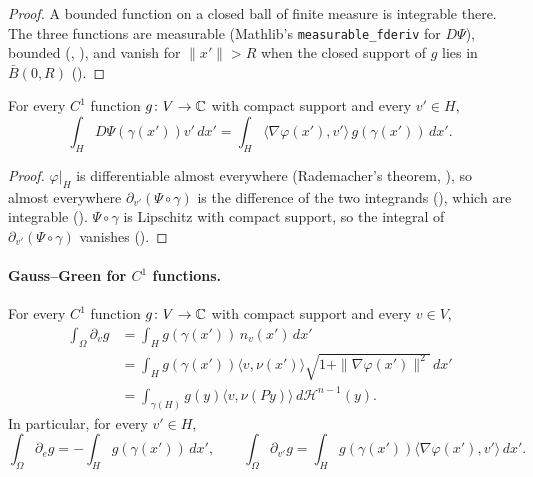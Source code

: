 \begin{proof}
\leanok
A bounded function on a closed ball of finite measure is integrable there. The three functions
are measurable (Mathlib's \texttt{measurable\_\allowbreak fderiv} for $D\Psi$), bounded
(, ), and vanish for $\|x'\| > R$ when
the closed support of $g$ lies in $\bar B(0, R)$ ().
\end{proof}

\begin{theorem}
\label{thm:graph-horizontal}
\leanok
{}
For every $C^1$ function $g \colon V \to \mathbb{C}$ with compact support and every $v' \in H$,
\[
  \int_H D\Psi(\gamma(x')) v' \, dx'
  = \int_H \langle \nabla\varphi(x'), v' \rangle \, g(\gamma(x')) \, dx' .
\]
\end{theorem}

\begin{proof}
\leanok
$\varphi|_H$ is differentiable almost everywhere (Rademacher's theorem,
), so almost everywhere $\partial_{v'} (\Psi \circ \gamma)$ is the
difference of the two integrands (), which are integrable
(). $\Psi \circ \gamma$ is Lipschitz with compact support, so
the integral of $\partial_{v'} (\Psi \circ \gamma)$ vanishes
().
\end{proof}

\paragraph{Gauss--Green for $C^1$ functions.}

\begin{theorem}
\label{thm:graph-gauss-green}
\leanok
{}
For every $C^1$ function $g \colon V \to \mathbb{C}$ with compact support and every $v \in V$,
\begin{align*}
  \int_\Omega \partial_v g &= \int_H g(\gamma(x')) \, n_v(x') \, dx' \\
  &= \int_H g(\gamma(x')) \langle v, \nu(x') \rangle \sqrt{1 + \|\nabla\varphi(x')\|^2} \, dx' \\
  &= \int_{\gamma(H)} g(y) \langle v, \nu(P y) \rangle \, d\mathcal H^{n-1}(y) .
\end{align*}
In particular, for every $v' \in H$,
\[
  \int_\Omega \partial_e g = -\int_H g(\gamma(x')) \, dx' ,
  \qquad
  \int_\Omega \partial_{v'} g = \int_H g(\gamma(x')) \langle \nabla\varphi(x'), v' \rangle \, dx' .
\]
\end{theorem}

